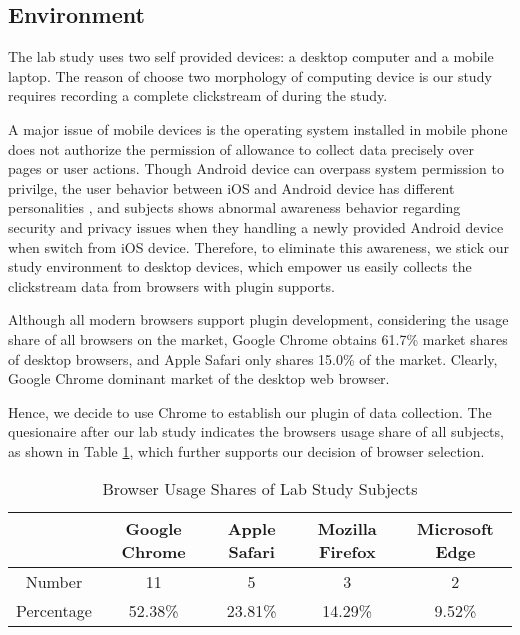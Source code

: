 \subsection{Environment}

The lab study uses two self provided devices: a desktop computer and a mobile laptop.
The reason of choose two morphology of computing device is our study requires recording
a complete clickstream of during the study.

A major issue of mobile devices is the operating system installed in mobile phone does not
authorize the permission of allowance to collect data precisely over pages or user actions.
Though Android device can overpass system permission to privilge, the user behavior 
between iOS and Android device has different personalities \cite{sandoio2018android}, and subjects shows \cite{reinfelder2014androidios} abnormal awareness behavior regarding security and privacy issues when they handling a newly provided Android device when switch from iOS device.
Therefore, to eliminate this awareness, we stick our study environment to desktop devices,
which empower us easily collects the clickstream data from browsers with plugin supports.

Although all modern browsers support plugin development, considering the usage share of 
all browsers on the market, Google Chrome \cite{wiki2018share} obtains 61.7\% 
market shares of desktop browsers, and Apple Safari only shares
15.0\% of the market. Clearly, Google Chrome dominant market of the desktop web browser.

Hence, we decide to use Chrome to establish our plugin of data collection.
The quesionaire after our lab study indicates the browsers usage share of all subjects, 
as shown in Table \ref{table:sharesubjects}, which further supports our decision of 
browser selection.

\begin{table}[H]
    \small
    \centering
    \setlength{\belowcaptionskip}{10pt}
    \caption{Browser Usage Shares of Lab Study Subjects}
    \begin{tabular}{ccccc}
          \toprule
        & \textbf{Google Chrome} & \textbf{Apple Safari} & \textbf{Mozilla Firefox} & \textbf{Microsoft Edge} \\
          \hline
          Number     & 11 & 5 & 3 & 2 \\
          Percentage & 52.38\% & 23.81\% & 14.29\% & 9.52\% \\
          \bottomrule
    \end{tabular}
    \label{table:sharesubjects}
\end{table}

